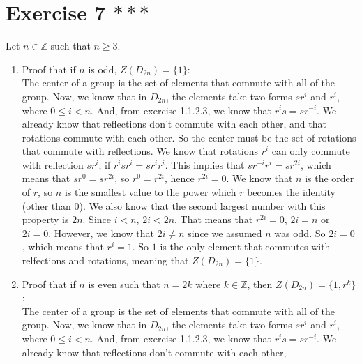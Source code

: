 \documentclass[12pt]{article}
\newcommand{\Z}{\mathbb{Z}}
\begin{document}
    \section*{Exercise 7 $***$}
    Let $n \in \Z$ such that $n \geqslant 3$. \\
    \begin{enumerate}[label=\textbf{\alph*.}]
        \item    
            Proof that if $n$ is odd, $Z(D_{2n}) = \{1\}$: \\
            The center of a group is the set of elements that commute
            with all of the group.
            Now, we know that in $D_{2n}$,
            the elements take two forms $sr^i$ and $r^i$,
            where $0 \leqslant i < n$.
            And, from exercise 1.1.2.3, we know that $r^is = sr^{-i}$.
            We already know that reflections don't commute with each other,
            and that rotations commute with each other.
            So the center must be the set of rotations that commute with
            reflections.
            We know that rotations $r^i$ can only commute with
            reflection $sr^i$,
            if $r^isr^i = sr^ir^i$.
            This implies that $sr^{-i}r^i = sr^{2i}$,
            which means that $sr^{0} = sr^{2i}$,
            so $r^{0} = r^{2i}$,
            hence $r^{2i} = 0$.
            We know that $n$ is the order of $r$,
            so $n$ is the smallest value to the power which $r$
            becomes the identity (other than 0).
            We also know that the second largest number with this
            property is $2n$.
            Since $i < n$, $2i < 2n$.
            That means that $r^{2i} = 0$, $2i = n$ or $2i = 0$.
            However, we know that $2i \neq n$ since we assumed $n$ was odd.
            So $2i = 0$, which means that $r^i = 1$.
            So $1$ is the only element that commutes with relfections
            and rotations,
            meaning that $Z(D_{2n}) = \{1\}$.
        \item
            Proof that if $n$ is even such that $n = 2k$ where $k \in \Z$,
            then $Z(D_{2n}) = \{1, r^k\}$: \\
            The center of a group is the set of elements that commute
            with all of the group.
            Now, we know that in $D_{2n}$,
            the elements take two forms $sr^i$ and $r^i$,
            where $0 \leqslant i < n$.
            And, from exercise 1.1.2.3, we know that $r^is = sr^{-i}$.
            We already know that reflections don't commute with each other,

\end{enumerate}
\end{document}
